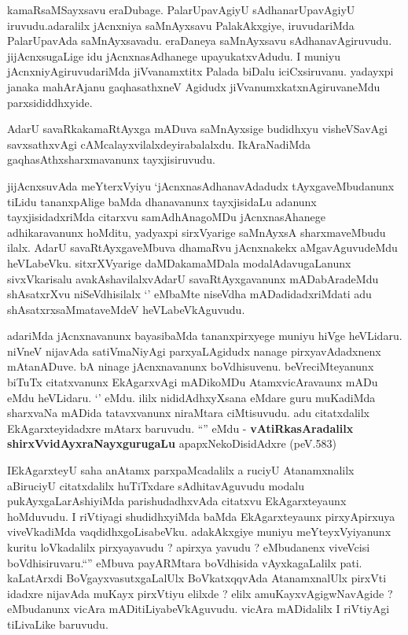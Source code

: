 \begin{artha}

kamaRsaMSayxsavu eraDubage. PalarUpavAgiyU sAdhanarUpavAgiyU
iruvudu.adaralilx jAcnxniya saMnAyxsavu PalakAkxgiye, iruvudariMda
PalarUpavAda saMnAyxsavadu. eraDaneya saMnAyxsavu
sAdhanavAgiruvudu. jijAcnxsugaLige idu jAcnxnasAdhanege
upayukatxvAdudu. I muniyu jAcnxniyAgiruvudariMda jiVvanamxtitx Palada
biDalu iciCxsiruvanu. yadayxpi janaka mahArAjanu gaqhasathxneV Agidudx
jiVvanumxkatxnAgiruvaneMdu parxsididdhxyide. 

AdarU savaRkakamaRtAyxga mADuva saMnAyxsige budidhxyu visheVSavAgi
savxsathxvAgi cAMcalayxvilalxdeyirabalalxdu. IkAraNadiMda
gaqhasAthxsharxmavanunx tayxjisiruvudu.

jijAcnxsuvAda meYterxVyiyu `jAcnxnasAdhanavAdadudx tAyxgaveMbudanunx
tiLidu tananxpAlige baMda dhanavanunx tayxjisidaLu adanunx
tayxjisidadxriMda citarxvu samAdhAnagoMDu jAcnxnasAhanege
adhikaravanunx hoMditu, yadyaxpi sirxVyarige saMnAyxsA sharxmaveMbudu
ilalx. AdarU savaRtAyxgaveMbuva dhamaRvu jAcnxnakekx aMgavAguvudeMdu
heVLabeVku. sitxrXVyarige daMDakamaMDala modalAdavugaLanunx
sivxVkarisalu avakAshavilalxvAdarU savaRtAyxgavanunx mADabAradeMdu
shAsatxrXvu niSeVdhisilalx `\stext' eMbaMte niseVdha mADadidadxriMdati
adu shAsatxrxsaMmataveMdeV heVLabeVkAguvudu.

adariMda  jAcnxnavanunx bayasibaMda tananxpirxyege muniyu hiVge
heVLidaru. niVneV nijavAda satiVmaNiyAgi parxyaLAgidudx nanage
pirxyavAdadxnenx mAtanADuve. bA ninage jAcnxnavanunx
boVdhisuvenu. beVreciMteyanunx biTuTx citatxvanunx EkAgarxvAgi
mADikoMDu AtamxvicAravaunx mADu eMdu heVLidaru. `\stext' eMdu. ililx
nididAdhxyXsana eMdare guru muKadiMda sharxvaNa mADida tatavxvanunx
niraMtara ciMtisuvudu. adu citatxdalilx EkAgarxteyidadxre mAtarx
baruvudu. ``\stext'' eMdu - \textbf{vAtiRkasAradalilx}\textbf{ shirxVvidAyxraNayxgurugaLu} 
apapxNekoDisidAdxre (peV.583)
\end{artha}

\begin{artha}
IEkAgarxteyU saha anAtamx parxpaMcadalilx a ruciyU Atanamxnalilx
aBiruciyU citatxdalilx huTiTxdare sAdhitavAguvudu modalu
pukAyxgaLarAshiyiMda parishudadhxvAda citatxvu EkAgarxteyaunx
hoMduvudu. I riVtiyagi shudidhxyiMda baMda EkAgarxteyaunx
pirxyApirxuya viveVkadiMda vaqdidhxgoLisabeVku. adakAkxgiye  muniyu
meYteyxVyiyanunx kuritu loVkadalilx pirxyayavudu ? apirxya yavudu ?
eMbudanenx viveVcisi boVdhisiruvaru.``\stext'' eMbuva payARMtara
boVdhisida vAyxkagaLalilx pati. kaLatArxdi BoVgayxvasutxgaLalUlx
BoVkatxqqvAda AtanamxnalUlx pirxVti idadxre nijavAda muKayx pirxVtiyu
elilxde ? elilx amuKayxvAgigwNavAgide ? eMbudanunx vicAra
mADitiLiyabeVkAguvudu. vicAra mADidalilx I riVtiyAgi tiLivaLike baruvudu.
\end{artha}

